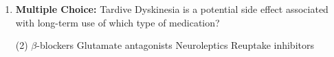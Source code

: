 \begin{enumerate}[label=\textbf{Q4.1.\arabic*}]
    \item \textbf{Multiple Choice:} Tardive Dyskinesia is a potential side effect associated with long-term use of which type of medication?
    \begin{tasks}[label=\textcolor{\documentTheme}{(\Alph*)}, item-format=\color{\documentTheme}, label-width=1.5em, item-indent=1.7em](2)
        \task \(\beta\)-blockers
        \task Glutamate antagonists
        \task Neuroleptics
        \task Reuptake inhibitors
    \end{tasks}






\end{enumerate}
